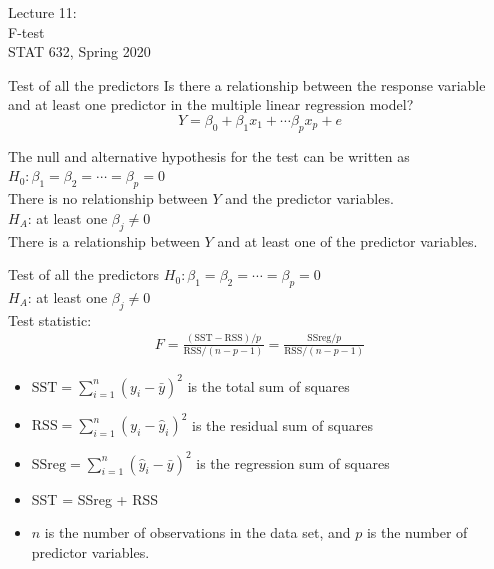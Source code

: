 \documentclass[10pt]{beamer}\usepackage[]{graphicx}\usepackage[]{color}
\newcommand{\SST}{\text{SST}}
\newcommand{\RSS}{\text{RSS}}
\newcommand{\SSreg}{\text{SSreg}}
\begin{document}
\begin{frame}
\large
Lecture 11:\\ 
F-test\\
STAT 632, Spring 2020\\
\end{frame}


\begin{frame}{Test of all the predictors}
Is there a relationship between the response variable and at least one predictor in the multiple linear regression model?\\
$$Y = \beta_0 + \beta_1 x_1 + \cdots \beta_p x_p + e$$
\vspace{5pt}

The null and alternative hypothesis for the test can be written as\\
\vspace{5pt}
$H_0: \beta_1 = \beta_2 = \cdots = \beta_p = 0$\\
There is no relationship between $Y$ and the predictor variables.\\
\vspace{7pt}
$H_A$:  at least one $\beta_j \neq 0$\\
There is a relationship between $Y$ and at least one of the predictor variables.
\end{frame}

\begin{frame}{Test of all the predictors}
$H_0: \beta_1 = \beta_2 = \cdots = \beta_p = 0$\\
\vspace{5pt}
$H_A$:  at least one $\beta_j \neq 0$\\
\vspace{10pt}
Test statistic:
\begin{align*}
F = \frac{(\SST - \RSS)/p}{\RSS / (n-p-1)} = 
\frac{\SSreg / p}{\RSS / (n-p-1)}
\end{align*}

\begin{itemize}
\item $\SST = \sum_{i=1}^n (y_i - \bar{y})^2$ is the total sum of squares
\item $\RSS = \sum_{i=1}^n (y_i - \hat{y}_i)^2$ is the residual sum of squares
\item $\SSreg = \sum_{i=1}^n (\hat{y}_i - \bar{y})^2$ is the regression sum of squares
\item SST = SSreg + RSS
\item $n$ is the number of observations in the data set, and $p$ is the number of predictor variables.
\end{itemize}
\end{frame}
\end{document}

